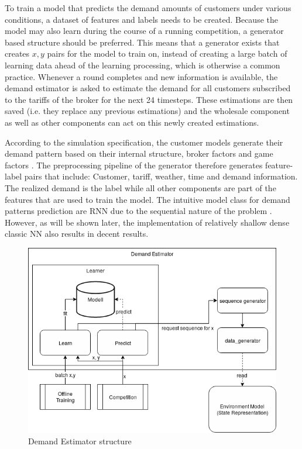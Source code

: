 To train a model that predicts the demand amounts of customers under various conditions, a dataset of features and
labels needs to be created. Because the model may also learn during the course of a running competition, a generator
based structure should be preferred. This means that a generator exists that creates $x, y$ pairs for the model to train
on, instead of creating a large batch of learning data ahead of the learning processing, which is otherwise a common
practice. Whenever a round completes and new information is available, the demand estimator is asked to estimate the
demand for all customers subscribed to the tariffs of the broker for the next 24 timesteps. These estimations are then
saved (i.e. they replace any previous estimations) and the wholesale component as well as other components can act on
this newly created estimations.

According to the simulation specification, the customer models generate their demand pattern based on their internal
structure, broker factors and game factors \citep[]{ketter2018powertac}. The preprocessing pipeline of the generator therefore generates
feature-label pairs that include: Customer, tariff, weather, time and demand information. The realized demand is the
label while all other components are part of the features that are used to train the model. The intuitive model class
for demand patterns prediction are \ac {RNN} due to the sequential nature of the problem \citep[]{EvalGRU2014}. However,
as will be shown later, the implementation of relatively shallow dense classic \ac {NN} also results in decent results.

\begin{figure}[h] 
    \centering 
    \includegraphics[width=0.8\linewidth]{img/UsageEstimator.png} 
    \caption{Demand Estimator structure} 
\label{fig:DemandEstimator} 
\end{figure}



